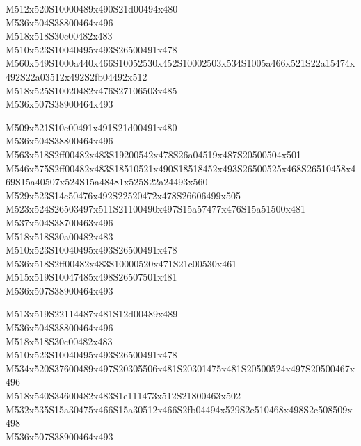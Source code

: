 \documentclass{article}
\begin{document}
\begin{multicols}{5}
\begin{center}
M512x520S10000489x490S21d00494x480 %
\\M536x504S38800464x496 %
\\M518x518S30c00482x483 %
\\M510x523S10040495x493S26500491x478 %
\\M560x549S1000a440x466S10052530x452S10002503x534S1005a466x521S22a15474x492S22a03512x492S2fb04492x512 %
\\M518x525S10020482x476S27106503x485 %
\\M536x507S38900464x493 %
\vfil
\columnbreak

M509x521S10e00491x491S21d00491x480 %
\\M536x504S38800464x496 %
\\M563x518S2ff00482x483S19200542x478S26a04519x487S20500504x501 %
\\M546x575S2ff00482x483S18510521x490S18518452x493S26500525x468S26510458x469S15a40507x524S15a48481x525S22a24493x560 %
\\M529x523S14c50476x492S22520472x478S26606499x505 %
\\M523x524S26503497x511S21100490x497S15a57477x476S15a51500x481 %
\\M537x504S38700463x496 %
\\M518x518S30a00482x483 %
\\M510x523S10040495x493S26500491x478 %
\\M536x518S2ff00482x483S10000520x471S21c00530x461 %
\\M515x519S10047485x498S26507501x481 %
\\M536x507S38900464x493 %
\vfil
\columnbreak

M513x519S22114487x481S12d00489x489 %
\\M536x504S38800464x496 %
\\M518x518S30c00482x483 %
\\M510x523S10040495x493S26500491x478 %
\\M534x520S37600489x497S20305506x481S20301475x481S20500524x497S20500467x496 %
\\M518x540S34600482x483S1e111473x512S21800463x502 %
\\M532x535S15a30475x466S15a30512x466S2fb04494x529S2e510468x498S2e508509x498 %
\\M536x507S38900464x493 %
\vfil
\columnbreak


\end{center}
\end{multicols}
\end{document}
